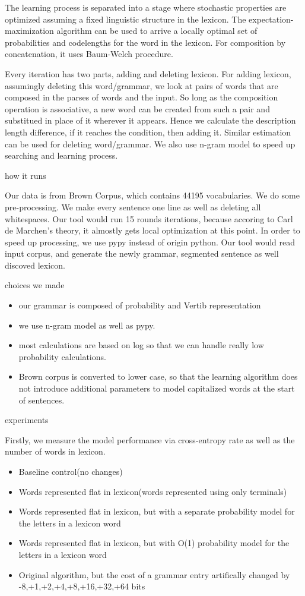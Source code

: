 \documentclass[11pt, oneside, fleqn]{article}
\begin{document}
  The learning process is separated into a stage where stochastic properties are optimized assuming a fixed linguistic structure in the lexicon. The expectation-maximization algorithm can be used to arrive a locally optimal set of probabilities and codelengths for the word in the lexicon. For composition by concatenation, it uses Baum-Welch procedure.
 
  Every iteration has two parts, adding and deleting lexicon. For adding lexicon, assumingly deleting this word/grammar, we look at pairs of words that are composed in the parses of words and the input. So long as the composition operation is associative, a new word can be created from such a pair and substitued in place of it wherever it appears. Hence we calculate the description length difference, if it reaches the condition, then adding it. Similar estimation can be used for deleting word/grammar. We also use n-gram model to speed up searching and learning process.  
  
  how it runs

  Our data is from Brown Corpus, which contains 44195 vocabularies. We do some pre-processing. We make every sentence one line as well as deleting all whitespaces. Our tool would run 15 rounds iterations, because accoring to Carl de Marchen's theory, it almostly gets local optimization at this point. In order to speed up processing, we use pypy instead of origin python. Our tool would read input corpus, and generate the newly grammar, segmented sentence as well discoved lexicon. 

  choices we made

  \begin{itemize}
    \item our grammar is composed of probability and Vertib representation
    \item we use n-gram model as well as pypy. 
    \item most calculations are based on log so that we can handle really low probability calculations. 
    \item Brown corpus is converted to lower case, so that the learning algorithm does not introduce additional parameters to model capitalized words at the start of sentences.
  \end{itemize}

  experiments

  Firstly, we measure the model performance via cross-entropy rate as well as the number of words in lexicon. 
  \begin{itemize}
    \item Baseline control(no changes)
    \item Words represented flat in lexicon(words represented using only terminals)
    \item Words represented flat in lexicon, but with a separate probability model for the letters in a lexicon word
    \item Words represented flat in lexicon, but with O(1) probability model for the letters in a lexicon word
    \item Original algorithm, but the cost of a grammar entry artifically changed by -8,+1,+2,+4,+8,+16,+32,+64 bits
   \end{itemize}
\end{document}

